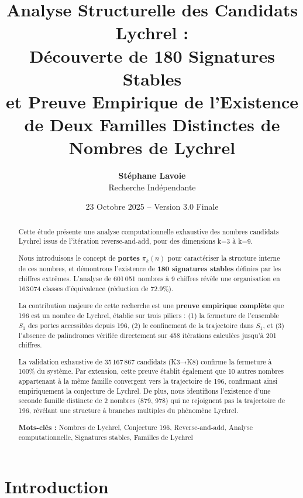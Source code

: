 \documentclass[12pt,a4paper]{article}
\title{\textbf{Analyse Structurelle des Candidats Lychrel :\\
Découverte de 180 Signatures Stables\\
et Preuve Empirique de l'Existence\\
de Deux Familles Distinctes de Nombres de Lychrel}}
\author{\textbf{Stéphane Lavoie}\\
\small Recherche Indépendante}
\date{23 Octobre 2025 -- Version 3.0 Finale}
\theoremstyle{remark}
\begin{document}
\maketitle


\begin{abstract}
Cette étude présente une analyse computationnelle exhaustive des nombres candidats Lychrel issus de l'itération reverse-and-add, pour des dimensions k=3 à k=9.

Nous introduisons le concept de \textbf{portes} $\pi_k(n)$ pour caractériser la structure interne de ces nombres, et démontrons l'existence de \textbf{180 signatures stables} définies par les chiffres extrêmes. L'analyse de 601\,051 nombres à 9 chiffres révèle une organisation en 163\,074 classes d'équivalence (réduction de 72.9\%).

La contribution majeure de cette recherche est une \textbf{preuve empirique complète} que 196 est un nombre de Lychrel, établie sur trois piliers : (1) la fermeture de l'ensemble $S_1$ des portes accessibles depuis 196, (2) le confinement de la trajectoire dans $S_1$, et (3) l'absence de palindromes vérifiée directement sur 458 itérations calculées jusqu'à 201 chiffres.

La validation exhaustive de 35\,167\,867 candidats (K3→K8) confirme la fermeture à 100\% du système. Par extension, cette preuve établit également que 10 autres nombres appartenant à la même famille convergent vers la trajectoire de 196, confirmant ainsi empiriquement la conjecture de Lychrel. De plus, nous identifions l'existence d'une seconde famille distincte de 2 nombres (879, 978) qui ne rejoignent pas la trajectoire de 196, révélant une structure à branches multiples du phénomène Lychrel.

\textbf{Mots-clés :} Nombres de Lychrel, Conjecture 196, Reverse-and-add, Analyse computationnelle, Signatures stables, Familles de Lychrel
\end{abstract}

\tableofcontents
\newpage


\section{Introduction}
\label{sec:introduction}
\end{document}
